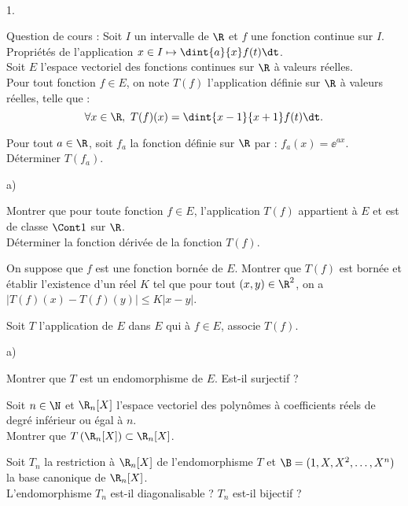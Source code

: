 \documentclass[11pt]{article}%
\begin{document}
\begin{exerciceAP}~
  \begin{noliste}{1.}
    \setlength{\itemsep}{2mm}
  \item Question de cours : Soit $I$ un intervalle de $\R$ et $f$ une
    fonction continue sur $I$.\\
    Propriétés de l'application $x\in I \mapsto \dint{a}{x} f(t)\dt$.\\
    Soit $E$ l'espace vectoriel des fonctions continues sur $\R$ à
    valeurs réelles.\\
    Pour tout fonction $f\in E$, on note $T(f)$ l'application définie
    sur $\R$ à valeurs réelles, telle que :
    \[
    \forall x\in\R, \ T(f)(x)=\dint{x-1}{x+1} f(t)\dt.
    \]
  \item Pour tout $a\in\R$, soit $f_a$ la fonction définie sur $\R$
    par : $f_a(x)=\ee^{ax}$. Déterminer $T(f_a)$.
  \item 
    \begin{noliste}{a)}
    \setlength{\itemsep}{2mm}
    \item Montrer que pour toute fonction $f\in E$, l'application
      $T(f)$ appartient à $E$ et est de classe $\Cont 1$ sur $\R$.\\
      Déterminer la fonction dérivée de la fonction $T(f)$.
    \item On suppose que $f$ est une fonction bornée de $E$. Montrer
      que $T(f)$ est bornée et établir l'existence d'un réel $K$ tel
      que pour tout $(x,y)\in\R^2$, on a $\vert T(f)(x)-T(f)(y)\vert
      \leq K \vert x-y\vert$.
    \end{noliste}

  \item Soit $T$ l'application de $E$ dans $E$ qui à $f\in E$, associe
    $T(f)$.
    \begin{noliste}{a)}
    \setlength{\itemsep}{2mm}
    \item Montrer que $T$ est un endomorphisme de $E$. Est-il
      surjectif ?
    \item Soit $n\in\N$ et $\R_n[X]$ l'espace vectoriel des polynômes
      à coefficients réels de degré inférieur ou égal à $n$.\\
      Montrer que $T\left(\R_n[X]\right) \subset \R_n[X]$.
    \item Soit $T_n$ la restriction à $\R_n[X]$ de l'endomorphisme $T$
      et $\B=(1,X,X^2,\hdots, X^n)$ la base canonique de $\R_n[X]$.\\
      L'endomorphisme $T_n$ est-il diagonalisable ? $T_n$ est-il
      bijectif ?
    \end{noliste}
  \end{noliste}
\end{exerciceAP}
\end{document}
